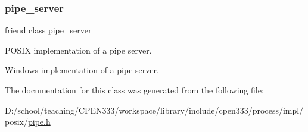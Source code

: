 \subsubsection{\texorpdfstring{pipe\+\_\+server}{pipe\_server}}
{\footnotesize\ttfamily friend class \hyperlink{classcpen333_1_1process_1_1posix_1_1pipe__server}{pipe\+\_\+server}\hspace{0.3cm}{\ttfamily [friend]}}



P\+O\+S\+IX implementation of a pipe server. 

Windows implementation of a pipe server. 

The documentation for this class was generated from the following file\+:\begin{DoxyCompactItemize}
\item 
D\+:/school/teaching/\+C\+P\+E\+N333/workspace/library/include/cpen333/process/impl/posix/\hyperlink{impl_2posix_2pipe_8h}{pipe.\+h}\end{DoxyCompactItemize}
